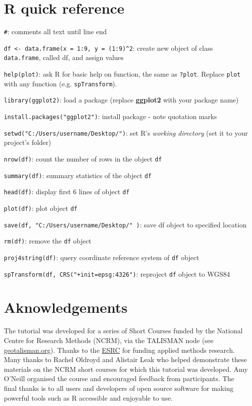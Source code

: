 \documentclass[]{article}
\begin{document}
\newpage \section{R quick reference}\label{r-quick-reference}

\texttt{\#}: comments all text until line end

\texttt{df \textless{}- data.frame(x = 1:9, y = (1:9)\^{}2}: create new
object of class \texttt{data.frame}, called df, and assign values

\texttt{help(plot)}: ask R for basic help on function, the same as
\texttt{?plot}. Replace \texttt{plot} with any function (e.g.
\texttt{spTransform}).

\texttt{library(ggplot2)}: load a package (replace \textbf{ggplot2} with
your package name)

\texttt{install.packages("ggplot2")}: install package - note quotation
marks

\texttt{setwd("C:/Users/username/Desktop/")}: set R's \emph{working
directory} (set it to your project's folder)

\texttt{nrow(df)}: count the number of rows in the object \texttt{df}

\texttt{summary(df)}: summary statistics of the object \texttt{df}

\texttt{head(df)}: display first 6 lines of object \texttt{df}

\texttt{plot(df)}: plot object \texttt{df}

\texttt{save(df, "C:/Users/username/Desktop/" )}: save df object to
specified location

\texttt{rm(df)}: remove the \texttt{df} object

\texttt{proj4string(df)}: query coordinate reference system of
\texttt{df} object

\texttt{spTransform(df, CRS("+init=epsg:4326")}: reproject \texttt{df}
object to WGS84

\section{Aknowledgements}\label{aknowledgements}

The tutorial was developed for a series of Short Courses funded by the
National Centre for Research Methods (NCRM), via the TALISMAN node (see
\href{http://www.geotalisman.org/}{geotalisman.org}). Thanks to the
\href{http://www.esrc.ac.uk/}{ESRC} for funding applied methods
research. Many thanks to Rachel Oldroyd and Alistair Leak who helped
demonstrate these materials on the NCRM short courses for which this
tutorial was developed. Amy O'Neill organised the course and encouraged
feedback from participants. The final thanks is to all users and
developers of open source software for making powerful tools such as R
accessible and enjoyable to use.
\end{document}
